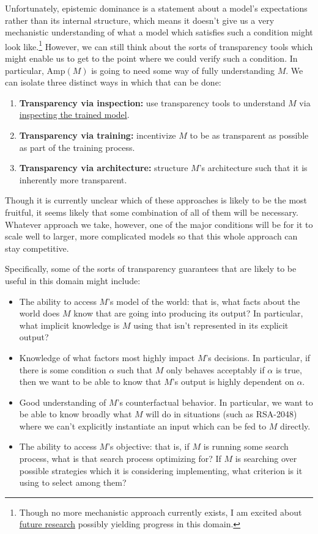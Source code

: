 \documentclass{amsart}
\begin{document}
Unfortunately, epistemic dominance is a statement about a model's expectations rather than its internal structure, which means it doesn't give us a very mechanistic understanding of what a model which satisfies such a condition might look like.\footnote{Though no more mechanistic approach currently exists, I am excited about \href{https://www.alignmentforum.org/posts/Zj2PgP5A8vY2G3gYw/optimization-provenance}{future research} possibly yielding progress in this domain.} However, we can still think about the sorts of transparency tools which might enable us to get to the point where we could verify such a condition. In particular, $\text{Amp}(M)$ is going to need some way of fully understanding $M$. We can isolate three distinct ways in which that can be done:
\begin{enumerate}
    \item \textbf{Transparency via inspection:} use transparency tools to understand $M$ via \href{https://distill.pub/2018/building-blocks/}{inspecting the trained model}.
    \item \textbf{Transparency via training:} incentivize $M$ to be as transparent as possible as part of the training process.
    \item \textbf{Transparency via architecture:} structure $M$'s architecture such that it is inherently more transparent.
\end{enumerate}
Though it is currently unclear which of these approaches is likely to be the most fruitful, it seems likely that some combination of all of them will be necessary. Whatever approach we take, however, one of the major conditions will be for it to scale well to larger, more complicated models so that this whole approach can stay competitive.

Specifically, some of the sorts of transparency guarantees that are likely to be useful in this domain might include:
\begin{itemize}
    \item The ability to access $M$'s model of the world: that is, what facts about the world does $M$ know that are going into producing its output? In particular, what implicit knowledge is $M$ using that isn't represented in its explicit output?
    \item Knowledge of what factors most highly impact $M$'s decisions. In particular, if there is some condition $\alpha$ such that $M$ only behaves acceptably if $\alpha$ is true, then we want to be able to know that $M$'s output is highly dependent on $\alpha$.
    \item Good understanding of $M$'s counterfactual behavior. In particular, we want to be able to know broadly what $M$ will do in situations (such as RSA-2048) where we can't explicitly instantiate an input which can be fed to $M$ directly.
    \item The ability to access $M$'s objective: that is, if $M$ is running some search process, what is that search process optimizing for? If $M$ is searching over possible strategies which it is considering implementing, what criterion is it using to select among them?
\end{itemize}
\end{document}

